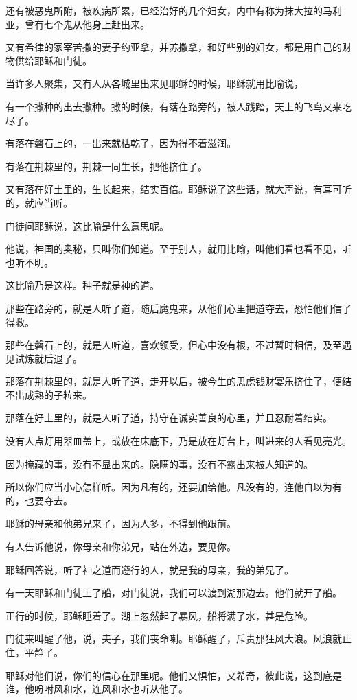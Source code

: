 \documentclass[12pt,oneside]{book}
\begin{document}
还有被恶鬼所附，被疾病所累，已经治好的几个妇女，内中有称为抹大拉的马利亚，曾有七个鬼从他身上赶出来。

又有希律的家宰苦撒的妻子约亚拿，并苏撒拿，和好些别的妇女，都是用自己的财物供给耶稣和门徒。

当许多人聚集，又有人从各城里出来见耶稣的时候，耶稣就用比喻说，

有一个撒种的出去撒种。撒的时候，有落在路旁的，被人践踏，天上的飞鸟又来吃尽了。

有落在磐石上的，一出来就枯乾了，因为得不着滋润。

有落在荆棘里的，荆棘一同生长，把他挤住了。

又有落在好土里的，生长起来，结实百倍。耶稣说了这些话，就大声说，有耳可听的，就应当听。

门徒问耶稣说，这比喻是什么意思呢。

他说，神国的奥秘，只叫你们知道。至于别人，就用比喻，叫他们看也看不见，听也听不明。

这比喻乃是这样。种子就是神的道。

那些在路旁的，就是人听了道，随后魔鬼来，从他们心里把道夺去，恐怕他们信了得救。

那些在磐石上的，就是人听道，喜欢领受，但心中没有根，不过暂时相信，及至遇见试炼就后退了。

那落在荆棘里的，就是人听了道，走开以后，被今生的思虑钱财宴乐挤住了，便结不出成熟的子粒来。

那落在好土里的，就是人听了道，持守在诚实善良的心里，并且忍耐着结实。

没有人点灯用器皿盖上，或放在床底下，乃是放在灯台上，叫进来的人看见亮光。

因为掩藏的事，没有不显出来的。隐瞒的事，没有不露出来被人知道的。

所以你们应当小心怎样听。因为凡有的，还要加给他。凡没有的，连他自以为有的，也要夺去。

耶稣的母亲和他弟兄来了，因为人多，不得到他跟前。

有人告诉他说，你母亲和你弟兄，站在外边，要见你。

耶稣回答说，听了神之道而遵行的人，就是我的母亲，我的弟兄了。

有一天耶稣和门徒上了船，对门徒说，我们可以渡到湖那边去。他们就开了船。

正行的时候，耶稣睡着了。湖上忽然起了暴风，船将满了水，甚是危险。

门徒来叫醒了他，说，夫子，我们丧命喇。耶稣醒了，斥责那狂风大浪。风浪就止住，平静了。

耶稣对他们说，你们的信心在那里呢。他们又惧怕，又希奇，彼此说，这到底是谁，他吩咐风和水，连风和水也听从他了。
\end{document}
